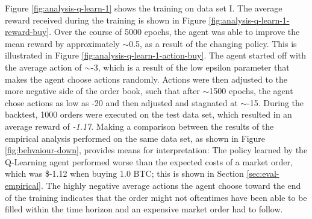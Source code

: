Figure \ref{fig:analysis-q-learn-1} shows the training on data set I.
The average reward received during the training is shown in Figure \ref{fig:analysis-q-learn-1-reward-buy}.
Over the course of 5000 epochs, the agent was able to improve the mean reward by approximately $\sim$0.5, as a result of the changing policy.  This is illustrated in Figure \ref{fig:analysis-q-learn-1-action-buy}.
The agent started off with the average action of $\sim$-3, which is a result of the low epsilon parameter that makes the agent choose actions randomly.
Actions were then adjusted to the more negative side of the order book, such that after $\sim$1500 epochs, the agent chose actions as low as -20 and then adjusted and stagnated at $\sim$-15.
During the backtest, 1000 orders were executed on the test data set, which resulted in an average reward of \textit{-1.17}.
Making a comparison between the results of the empirical analysis performed on the same data set, as shown in Figure \ref{fig:behvaiour-down}, provides means for interpretation:
The policy learned by the Q-Learning agent performed worse than the expected costs of a market order, which was \$-1.12 when buying 1.0 BTC; this is shown in Section \ref{sec:eval-empirical}.
The highly negative average actions the agent choose toward the end of the training indicates that the order might not oftentimes have been able to be filled within the time horizon and an expensive market order had to follow.

